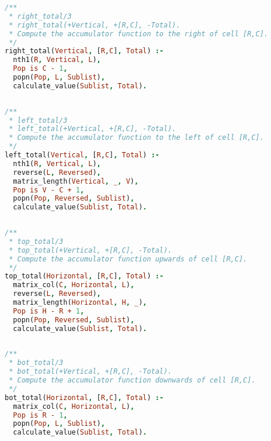 \documentclass[runningheads]{llncs}
\begin{document}
\begin{center}
\begin{minipage}{0.85\textwidth}
\centering\ttfamily
\begin{lstlisting}[language=Prolog]
/**
 * right_total/3
 * right_total(+Vertical, +[R,C], -Total).
 * Compute the accumulator function to the right of cell [R,C].
 */
right_total(Vertical, [R,C], Total) :-
  nth1(R, Vertical, L),
  Pop is C - 1,
  popn(Pop, L, Sublist),
  calculate_value(Sublist, Total).
  
\end{lstlisting}
\end{minipage}
\end{center}

\begin{center}
\begin{minipage}{0.85\textwidth}
\centering\ttfamily
\begin{lstlisting}[language=Prolog]
/**
 * left_total/3
 * left_total(+Vertical, +[R,C], -Total).
 * Compute the accumulator function to the left of cell [R,C].
 */
left_total(Vertical, [R,C], Total) :-
  nth1(R, Vertical, L),
  reverse(L, Reversed),
  matrix_length(Vertical, _, V),
  Pop is V - C + 1,
  popn(Pop, Reversed, Sublist),
  calculate_value(Sublist, Total).
  
\end{lstlisting}
\end{minipage}
\end{center}

\begin{center}
\begin{minipage}{0.85\textwidth}
\centering\ttfamily
\begin{lstlisting}[language=Prolog]
/**
 * top_total/3
 * top_total(+Vertical, +[R,C], -Total).
 * Compute the accumulator function upwards of cell [R,C].
 */
top_total(Horizontal, [R,C], Total) :-
  matrix_col(C, Horizontal, L),
  reverse(L, Reversed),
  matrix_length(Horizontal, H, _),
  Pop is H - R + 1,
  popn(Pop, Reversed, Sublist),
  calculate_value(Sublist, Total).
  
\end{lstlisting}
\end{minipage}
\end{center}

\begin{center}
\begin{minipage}{0.85\textwidth}
\centering\ttfamily
\begin{lstlisting}[language=Prolog]
/**
 * bot_total/3
 * bot_total(+Vertical, +[R,C], -Total).
 * Compute the accumulator function downwards of cell [R,C].
 */
bot_total(Horizontal, [R,C], Total) :-
  matrix_col(C, Horizontal, L),
  Pop is R - 1,
  popn(Pop, L, Sublist),
  calculate_value(Sublist, Total).

\end{lstlisting}
\end{minipage}
\end{center}
\end{document}
